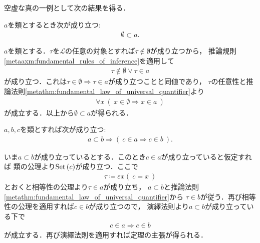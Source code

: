 	空虚な真の一例として次の結果を得る．
	
	\begin{screen}
		\begin{thm}[空集合は全ての類に含まれる]\label{thm:emptyset_if_a_subset_of_every_class}
			$a$を類とするとき次が成り立つ:
			\begin{align}
				\emptyset \subset a.
			\end{align}
		\end{thm}
	\end{screen}
	
	\begin{prf}
		$a$を類とする．$\tau$を$\mathcal{L}$の任意の対象とすれば$\tau \notin \emptyset$が成り立つから，
		推論規則\ref{metaaxm:fundamental_rules_of_inference}を適用して
		\begin{align}
			\tau \notin \emptyset \vee \tau \in a
		\end{align}
		が成り立つ．これは$\tau \in \emptyset \Longrightarrow \tau \in a$が成り立つことと同値であり，
		$\tau$の任意性と推論法則\ref{metathm:fundamental_law_of_universal_quantifier}より
		\begin{align}
			\forall x\ (\ x \in \emptyset \Longrightarrow x \in a\ )
		\end{align}
		が成立する．以上から$\emptyset \subset a$が得られる．
		\QED
	\end{prf}
	
	\begin{screen}
		\begin{thm}[類はその部分類に属する全ての類を要素に持つ]\label{thm:subclass_contains_all_elements}
			$a,b,c$を類とすれば次が成り立つ:
			\begin{align}
				a \subset b \Longrightarrow (\ c \in a \Longrightarrow c \in b\ ).
			\end{align}
		\end{thm}
	\end{screen}
	
	\begin{prf}	
		いま$a \subset b$が成り立っているとする．このとき$c \in a$が成り立っていると仮定すれば
		類の公理より$\operatorname*{Set} \left(c\right)$が成り立つ．ここで
		\begin{align}
			\tau \coloneqq \varepsilon x(\ c=x\ )
		\end{align}
		とおくと相等性の公理より$\tau \in a$が成り立ち，
		$a \subset b$と推論法則\ref{metathm:fundamental_law_of_universal_quantifier}から
		$\tau \in b$が従う．再び相等性の公理を適用すれば$c \in b$が成り立つので，
		演繹法則より$a \subset b$が成り立っている下で
		\begin{align}
			c \in a \Longrightarrow c \in b
		\end{align}
		が成立する．再び演繹法則を適用すれば定理の主張が得られる．
		\QED
	\end{prf}
	
